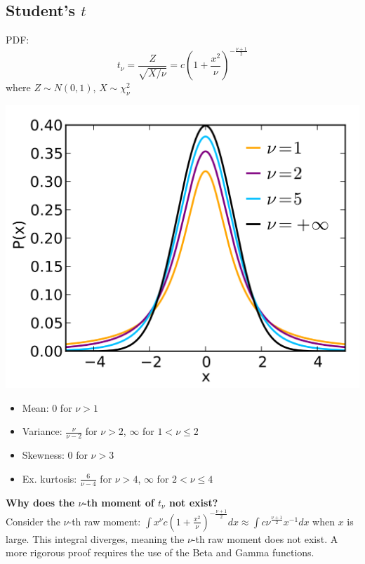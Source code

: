 \documentclass[DIV=14,titlepage=false]{scrreprt}
\begin{document}
\subsection*{Student's \( t \)}
PDF: \[ \displaystyle t_\nu = \frac{Z}{\sqrt{X/\nu}} = c\left(1+\frac{x^2}{\nu}\right)^{-\frac{\nu+1}{2}}\] where $Z\sim N(0,1)$, $X\sim \chi^2_\nu$

\begin{minipage}[c]{0.5\textwidth}
  \includegraphics[width=\textwidth]{./Images/tdistribuion.png}
  \end{minipage}
  \hfill
\begin{minipage}[c]{0.45\textwidth}
  \begin{itemize}
    \item Mean: $0$ for $\nu > 1$
    \item Variance: $\frac{\nu}{\nu - 2}$ for $\nu > 2$, $\infty$ for $1 < \nu \leq 2$
    \item Skewness: $0$ for $\nu > 3$
    \item Ex. kurtosis: $\frac{6}{\nu - 4}$ for $\nu > 4$, $\infty$ for $2 < \nu \leq 4$
  \end{itemize}
  
\end{minipage}

\textbf{Why does the $\nu$-th moment of $t_{\nu}$ not exist?}\\
Consider the $\nu$-th raw moment: $\int x^{\nu}c\left(1+\frac{x^2}{\nu}\right)^{-\frac{\nu+1}{2}}dx \approx \int c \nu^{\frac{\nu+1}{2}}x^{-1}dx$ when $x$ is large. This integral diverges, meaning the $\nu$-th raw moment does not exist. A more rigorous proof requires the use of the Beta and Gamma functions.
\end{document}
